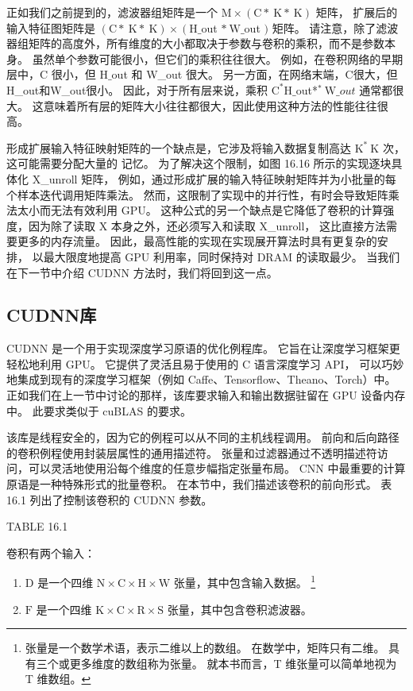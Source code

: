 正如我们之前提到的，滤波器组矩阵是一个 $\mathrm{M} \times(\mathrm{C} * \mathrm{~K} * \mathrm{~K})$ 矩阵，
扩展后的输入特征图矩阵是 $(\mathrm{C} * \mathrm{~K} * \mathrm{~K}) \times\left(\mathrm{H} \_\right.$out $* \mathrm{~W} \_ $out $)$ 矩阵。 
请注意，除了滤波器组矩阵的高度外，所有维度的大小都取决于参数与卷积的乘积，而不是参数本身。 
虽然单个参数可能很小，但它们的乘积往往很大。 
例如，在卷积网络的早期层中，$\mathrm{C}$ 很小，但 $\mathrm{H} \_$out 和 W\_out 很大。 
另一方面，在网络末端，$\mathrm{C}$很大，但H\_out和W\_out很小。 
因此，对于所有层来说，乘积 $\mathrm{C}^{*} \mathrm{H} \_$out*${ }^{*} \mathrm{~W} \_o u t$ 通常都很大。 
这意味着所有层的矩阵大小往往都很大，因此使用这种方法的性能往往很高。

形成扩展输入特征映射矩阵的一个缺点是，它涉及将输入数据复制高达 $\mathrm{K}^{*} \mathrm{~K}$ 次，
这可能需要分配大量的 记忆。 为了解决这个限制，如图 16.16 所示的实现逐块具体化 X\_unroll 矩阵，
例如，通过形成扩展的输入特征映射矩阵并为小批量的每个样本迭代调用矩阵乘法。 
然而，这限制了实现中的并行性，有时会导致矩阵乘法太小而无法有效利用 GPU。 
这种公式的另一个缺点是它降低了卷积的计算强度，因为除了读取 $\mathrm{X}$ 本身之外，还必须写入和读取 X\_unroll，
这比直接方法需要更多的内存流量。 因此，最高性能的实现在实现展开算法时具有更复杂的安排，
以最大限度地提高 GPU 利用率，同时保持对 DRAM 的读取最少。 当我们在下一节中介绍 CUDNN 方法时，我们将回到这一点。

\subsection{CUDNN库}
CUDNN 是一个用于实现深度学习原语的优化例程库。 它旨在让深度学习框架更轻松地利用 GPU。 
它提供了灵活且易于使用的 C 语言深度学习 API， 
可以巧妙地集成到现有的深度学习框架（例如 Caffe、Tensorflow、Theano、Torch）中。 
正如我们在上一节中讨论的那样，该库要求输入和输出数据驻留在 GPU 设备内存中。 
此要求类似于 cuBLAS 的要求。

该库是线程安全的，因为它的例程可以从不同的主机线程调用。 前向和后向路径的卷积例程使用封装层属性的通用描述符。 
张量和过滤器通过不透明描述符访问，可以灵活地使用沿每个维度的任意步幅指定张量布局。 
$\mathrm{CNN}$ 中最重要的计算原语是一种特殊形式的批量卷积。 
在本节中，我们描述该卷积的前向形式。 表 16.1 列出了控制该卷积的 CUDNN 参数。

{\color{red} TABLE 16.1}

卷积有两个输入：
\begin{enumerate}
   \item $\mathrm{D}$ 是一个四维 $\mathrm{N} \times \mathrm{C} \times \mathrm{H} \times \mathrm{W}$ 张量，其中包含输入数据。
   \footnote{张量是一个数学术语，表示二维以上的数组。 在数学中，矩阵只有二维。 
   具有三个或更多维度的数组称为张量。 就本书而言，T 维张量可以简单地视为 T 维数组。}

   \item $\mathrm{F}$ 是一个四维 $\mathrm{K} \times \mathrm{C} \times \mathrm{R} \times \mathrm{S}$ 张量，其中包含卷积滤波器。
\end{enumerate}

